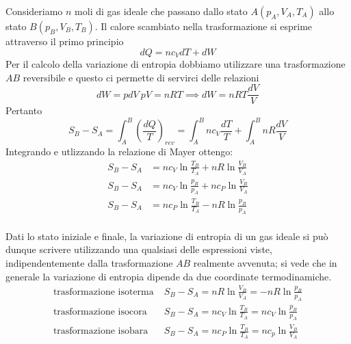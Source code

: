 \documentclass[class=book, crop=false, oneside, 12pt]{standalone}
\begin{document}
Consideriamo \(n\) moli di gas ideale che passano dallo stato \(A ( p_A , V_A, T_A)\) allo stato \(B ( p_B , V_B, T_B)\). 
Il calore scambiato nella trasformazione si esprime attraverso il primo principio
\begin{equation*}
    d Q = n c_V d T + d W
\end{equation*}
Per il calcolo della variazione di entropia dobbiamo utilizzare una trasformazione \(A B\) reversibile e questo ci permette di servirci delle relazioni
\begin{equation*}
    dW=pdV  \ pV=nRT \implies dW=nRT \frac{dV}{V}
\end{equation*}
Pertanto
\begin{equation}
    S_B - S_A = \int_A^B \left(\frac{d Q}{T}\right)_{rev} = \int_A^B n c_V \frac{d T}{T} + \int_A^B n R \frac{d V}{V}
\end{equation}
Integrando e utlizzando la relazione di Mayer ottengo:
\begin{align*}
    S_B - S_A &= n c_V \ln \frac{T_B}{T_A} + n R \ln \frac{V_B}{V_A}\\
    S_B - S_A &= n c_V \ln \frac{p_B}{p_A} + n c_P \ln \frac{V_B}{V_A}\\
    S_B - S_A &= n c_P \ln \frac{T_B}{T_A} - n R \ln \frac{p_B}{p_A}\\
\end{align*}

Dati lo stato iniziale e finale, la variazione di entropia di un gas ideale si può dunque scrivere utilizzando una qualsiasi delle espressioni viste, indipendentemente dalla trasformazione \(A B\) realmente avvenuta; si vede che in generale la variazione di entropia dipende da due coordinate termodinamiche.
\begin{align*}
    \text{trasformazione isoterma} \; &S_B - S_A = n R \ln \frac{V_B}{V_A} = - n R \ln \frac{p_B}{p_A} \\
    \text{trasformazione isocora} \; &S_B - S_A = n c_V \ln \frac{T_B}{T_A} = n c_V \ln \frac{p_B}{p_A}\\
    \text{trasformazione isobara} \; &S_B - S_A = n c_P \ln \frac{T_B}{T_A} = n c_p \ln \frac{V_B}{V_A}\\
\end{align*}
\end{document}
